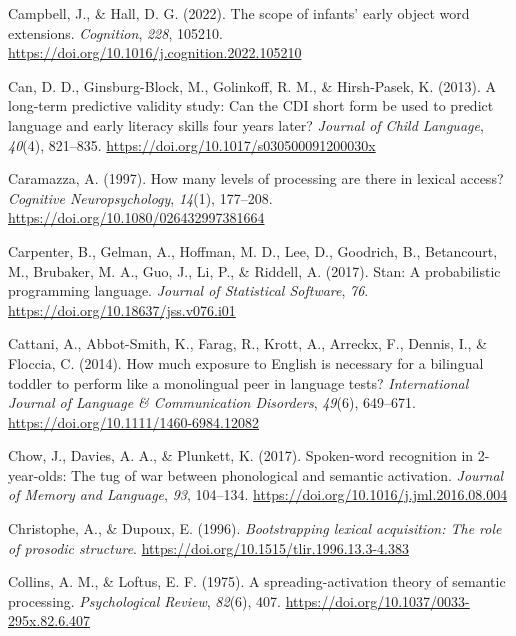 \documentclass[
  12pt,
  b5paperpaper,
  twoside]{scrreprt}
\newlength{\cslhangindent}
\newlength{\cslentryspacingunit} %
\newenvironment{CSLReferences}[2] %
 {%
  \setlength{\parindent}{0pt}
  \ifodd #1
  \let\oldpar\par
  \def\par{\hangindent=\cslhangindent\oldpar}
  \fi
  \setlength{\parskip}{#2\cslentryspacingunit}
 }%
 {}
\begin{document}
\begin{CSLReferences}{1}{0}
\leavevmode{}%
Campbell, J., \& Hall, D. G. (2022). The scope of infants' early object
word extensions. \emph{Cognition}, \emph{228}, 105210.
\url{https://doi.org/10.1016/j.cognition.2022.105210}

\leavevmode{}%
Can, D. D., Ginsburg-Block, M., Golinkoff, R. M., \& Hirsh-Pasek, K.
(2013). A long-term predictive validity study: Can the {CDI} short form
be used to predict language and early literacy skills four years later?
\emph{Journal of Child Language}, \emph{40}(4), 821--835.
\url{https://doi.org/10.1017/s030500091200030x}

\leavevmode{}%
Caramazza, A. (1997). How many levels of processing are there in lexical
access? \emph{Cognitive Neuropsychology}, \emph{14}(1), 177--208.
\url{https://doi.org/10.1080/026432997381664}

\leavevmode{}%
Carpenter, B., Gelman, A., Hoffman, M. D., Lee, D., Goodrich, B.,
Betancourt, M., Brubaker, M. A., Guo, J., Li, P., \& Riddell, A. (2017).
Stan: A probabilistic programming language. \emph{Journal of Statistical
Software}, \emph{76}. \url{https://doi.org/10.18637/jss.v076.i01}

\leavevmode{}%
Cattani, A., Abbot-Smith, K., Farag, R., Krott, A., Arreckx, F., Dennis,
I., \& Floccia, C. (2014). How much exposure to {English} is necessary
for a bilingual toddler to perform like a monolingual peer in language
tests? \emph{International Journal of Language \& Communication
Disorders}, \emph{49}(6), 649--671.
\url{https://doi.org/10.1111/1460-6984.12082}

\leavevmode{}%
Chow, J., Davies, A. A., \& Plunkett, K. (2017). Spoken-word recognition
in 2-year-olds: The tug of war between phonological and semantic
activation. \emph{Journal of Memory and Language}, \emph{93}, 104--134.
\url{https://doi.org/10.1016/j.jml.2016.08.004}

\leavevmode{}%
Christophe, A., \& Dupoux, E. (1996). \emph{Bootstrapping lexical
acquisition: The role of prosodic structure}.
\url{https://doi.org/10.1515/tlir.1996.13.3-4.383}

\leavevmode{}%
Collins, A. M., \& Loftus, E. F. (1975). A spreading-activation theory
of semantic processing. \emph{Psychological Review}, \emph{82}(6), 407.
\url{https://doi.org/10.1037/0033-295x.82.6.407}


\end{CSLReferences}
\end{document}
